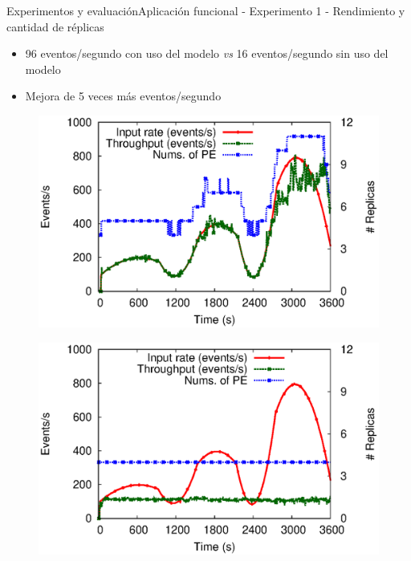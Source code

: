 \begin{frame}{Experimentos y evaluación}{Aplicación funcional - Experimento 1 - Rendimiento y cantidad de réplicas}

\begin{itemize}
\item 96 eventos/segundo con uso del modelo \textit{vs} 16 eventos/segundo sin uso del modelo
\item Mejora de 5 veces más eventos/segundo
\end{itemize}

\begin{multicols}{2}
\begin{figure}[p]
	\centering
	\includegraphics[scale=0.4]{images/exp/app1/dynamic/adaptative/exp1-processSystem.eps}
\end{figure}

\begin{figure}[p]
	\centering
	\includegraphics[scale=0.4]{images/exp/app1/dynamic/baseline/exp1-processSystem.eps}
\end{figure}
\end{multicols}
\end{frame}

